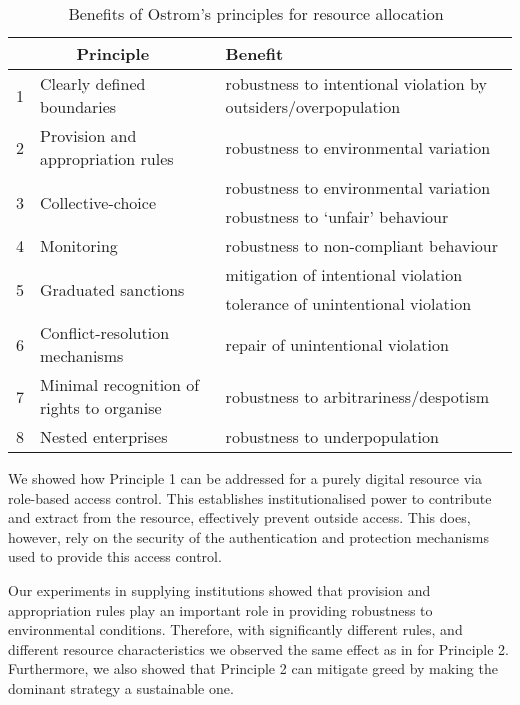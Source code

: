 \begin{table}[ht]
\centering
\caption[Benefits of Ostrom's principles for resource allocation]{Benefits of Ostrom's principles for resource allocation~\citep{Schaumeier2013}}\label{tab:principlebenefit}
\begin{tabularx}{\textwidth}{lp{4cm}X}
\multicolumn{2}{c}{Principle} & Benefit \\
\hline
1 & Clearly defined boundaries & robustness to intentional violation by outsiders/overpopulation \\
2 & Provision and appropriation rules & robustness to environmental variation \\
\multirow{2}{*}{3} & \multirow{2}{*}{Collective-choice} & robustness to environmental variation \\
 & & robustness to `unfair' behaviour \\
4 & Monitoring & robustness to non-compliant behaviour \\
\multirow{2}{*}{5} & \multirow{2}{*}{Graduated sanctions} & mitigation of intentional violation \\
 & & tolerance of unintentional violation \\
6 & Conflict-resolution mechanisms & repair of unintentional violation \\
7 & Minimal recognition of rights to organise & robustness to arbitrariness/despotism \\
8 & Nested enterprises & robustness to underpopulation \\
\end{tabularx}
\end{table}

We showed how Principle 1 can be addressed for a purely digital resource via
role-based access control. This establishes institutionalised power to
contribute and extract from the resource, effectively prevent outside access.
This does, however, rely on the security of the authentication and
protection mechanisms used to provide this access control. 

Our experiments in supplying institutions showed that provision and
appropriation rules play an important role in providing robustness to
environmental conditions. Therefore, with significantly different rules, and
different resource characteristics we observed the same effect as in
\citet{Pitt2012b} for Principle 2. Furthermore, we also showed that Principle 2
can mitigate greed by making the dominant strategy a sustainable one.

